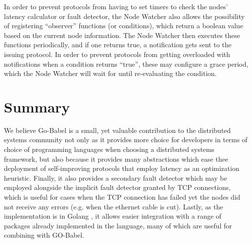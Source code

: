 In order to prevent protocols from having to set timers to check the nodes' latency calculator or fault detector, the Node Watcher also allows the possibility of registering ``observer'' functions (or conditions), which return a boolean value based on the current node information. The Node Watcher then executes these functions periodically, and if one returns true, a notification gets sent to the issuing protocol. In order to prevent protocols from getting overloaded with notifications when a condition returns ``true'', these may configure a grace period, which the Node Watcher will wait for until re-evaluating the condition.

\section{Summary}

We believe Go-Babel is a small, yet valuable contribution to the distributed systems community not only as it provides more choice for developers in terms of choice of programming languages when choosing a distributed systems framework, but also because it provides many abstractions which ease thee deployment of self-improving protocols that employ latency as an optimization heuristic. Finally, it also provides a secondary fault detector which may be employed alongside the implicit fault detector granted by TCP connections, which is useful for cases when the TCP connection has failed yet the nodes did not receive any errors (e.g. when the ethernet cable is cut). Lastly, as the implementation is in Golang \cite{golang}, it allows easier integration with a range of packages already implemented in the language, many of which are useful for combining with GO-Babel. 
